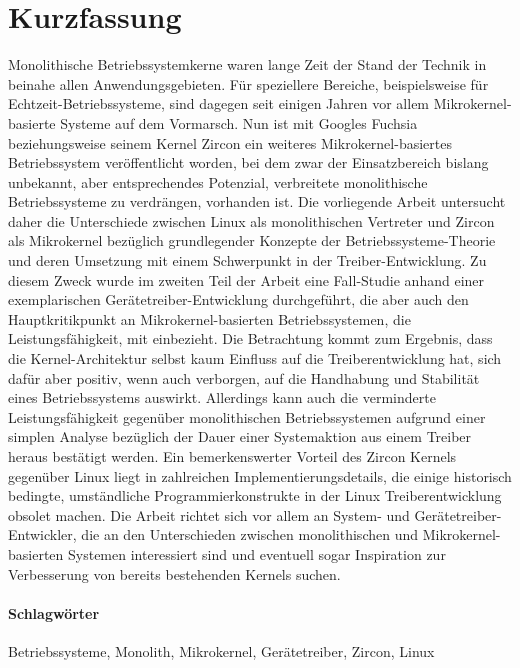 
\section*{Kurzfassung}
Monolithische Betriebssystemkerne waren lange Zeit der Stand der Technik in beinahe allen Anwendungsgebieten.
Für speziellere Bereiche, beispielsweise für Echtzeit-Betriebssysteme, sind dagegen seit einigen Jahren vor allem Mikrokernel-basierte Systeme auf dem Vormarsch.
Nun ist mit Googles Fuchsia beziehungsweise seinem Kernel Zircon ein weiteres Mikrokernel-basiertes Betriebssystem veröffentlicht worden, bei dem zwar der Einsatzbereich bislang unbekannt, aber entsprechendes Potenzial, verbreitete monolithische Betriebssysteme zu verdrängen, vorhanden ist.
Die vorliegende Arbeit untersucht daher die Unterschiede zwischen Linux als monolithischen Vertreter und Zircon als Mikrokernel bezüglich grundlegender Konzepte der Betriebssysteme-Theorie und deren Umsetzung mit einem Schwerpunkt in der Treiber-Entwicklung.
Zu diesem Zweck wurde im zweiten Teil der Arbeit eine Fall-Studie anhand einer exemplarischen Gerätetreiber-Entwicklung durchgeführt, die aber auch den Hauptkritikpunkt an Mikrokernel-basierten Betriebssystemen, die Leistungsfähigkeit, mit einbezieht.
Die Betrachtung kommt zum Ergebnis, dass die Kernel-Architektur selbst kaum Einfluss auf die Treiberentwicklung hat, sich dafür aber positiv, wenn auch verborgen, auf die Handhabung und Stabilität eines Betriebssystems auswirkt.
Allerdings kann auch die verminderte Leistungsfähigkeit gegenüber monolithischen Betriebssystemen aufgrund einer simplen Analyse bezüglich der Dauer einer Systemaktion aus einem Treiber heraus bestätigt werden.
Ein bemerkenswerter Vorteil des Zircon Kernels gegenüber Linux liegt in zahlreichen Implementierungsdetails, die einige historisch bedingte, umständliche Programmierkonstrukte in der Linux Treiberentwicklung obsolet machen.
Die Arbeit richtet sich vor allem an System- und Gerätetreiber-Entwickler, die an den Unterschieden zwischen monolithischen und Mikrokernel-basierten Systemen interessiert sind und eventuell sogar Inspiration zur Verbesserung von bereits bestehenden Kernels suchen.

\paragraph{Schlagwörter} Betriebssysteme, Monolith, Mikrokernel, Gerätetreiber, Zircon, Linux 

